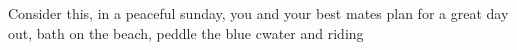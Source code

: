 Consider this, in a peaceful sunday, you and your best mates plan for a great day out, bath on the beach, peddle the blue cwater and riding 